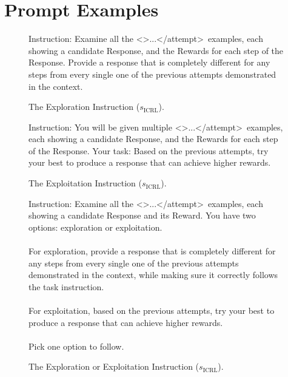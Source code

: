 \documentclass{article}
\newcommand{\0}{\mathbf{0}}
\newcommand{\icrl}{\text{ICRL}}
\begin{document}
\section{Prompt Examples}
\label{sec prompt exp}
\begin{figure}[htbp]
  \centering
  \begin{tcolorbox}[
      colback=gray!5!white,
      colframe=black!100!black,
      width=1\textwidth
  ]
  \small
  Instruction: Examine all the \textless{}\textgreater ...\textless/attempt\textgreater\  examples, each showing a candidate Response, and the Rewards for each step of the Response. Provide a response that is completely different for any steps from every single one of the previous attempts demonstrated in the context.
  \end{tcolorbox}
  \caption{The Exploration Instruction ($s_\icrl$).}
  \label{fig:exploration_instruction}
\end{figure}
\begin{figure}[htbp]
  \centering
  \begin{tcolorbox}[
      colback=gray!5!white,
      colframe=black!100!black,
      width=1\textwidth
  ]
  \small
  Instruction: You will be given multiple \textless{}\textgreater ...\textless/attempt\textgreater\  examples, each showing a candidate Response, and the Rewards for each step of the Response. Your task: Based on the previous attempts, try your best to produce a response that can achieve higher rewards.
  \end{tcolorbox}
  \caption{The Exploitation Instruction ($s_\icrl$).}
  \label{fig:exploitation_instruction}
\end{figure}
\begin{figure}[htbp]
  \centering
  \begin{tcolorbox}[
      colback=gray!5!white,
      colframe=black!100!black,
      width=1\textwidth
  ]
  \small
  Instruction: Examine all the \textless{}\textgreater ...\textless/attempt\textgreater\ examples, each showing a candidate Response and its Reward. You have two options: exploration or exploitation.
  \\
  \\
  For exploration, provide a response that is completely different for any steps from every single one of the previous attempts demonstrated in the context, while making sure it correctly follows the task instruction.
  \\
  \\
  For exploitation, based on the previous attempts, try your best to produce a response that can achieve higher rewards.
  \\
  \\
  Pick one option to follow.
  \end{tcolorbox}
  \caption{The Exploration or Exploitation Instruction ($s_\icrl$).}
  \label{fig:exploration_or_exploitation_instruction}
\end{figure}
\end{document}
